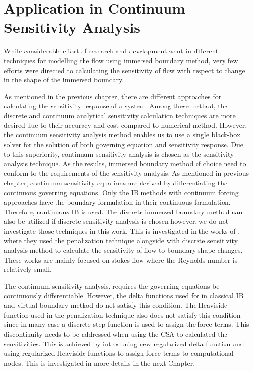 \section{Application in Continuum Sensitivity Analysis}
While considerable effort of research and development went in different techniques for modelling the flow using immersed boundary method, very few efforts were directed to calculating the sensitivity of flow with respect to change in the shape of the immersed boundary.

As mentioned in the previous chapter, there are different approaches for calculating the sensitivity response of a system. Among these method, the discrete and continuum analytical sensitivity calculation techniques are more desired due to their accuracy and cost compared to numerical method. However, the continuum sensitivity analysis method enables us to use a single black-box solver for the solution of both governing equation and sensitivity response. Due to this superiority, continuum sensitivity analysis is chosen as the sensitivity analysis technique. As the results, immersed boundary method of choice need to conform to the requirements of the sensitivity analysis. As mentioned in previous chapter, continuum sensitivity equations are derived by differentiating the continuous governing equations. Only the IB methods with continuum forcing approaches have the boundary formulation in their continuous formulation. Therefore, continuous IB is used. The discrete immersed boundary method can also be utilized if discrete sensitivity analysis is chosen however, we do not investigate those techniques in this work. This is investigated in the works of \cite{kreissl2011explicit, borrvall2003topology, challis2009level}, where they used the penalization technique alongside with discrete sensitivity analysis method to calculate the sensitivity of flow to boundary shape changes. These works are mainly focused on stokes flow where the Reynolds number is relatively small.

The continuum sensitivity analysis, requires the governing equations be continuously differentiable. However, the delta functions used for in classical IB and virtual boundary method do not satisfy this condition. The Heaviside function used in the penalization technique also does not satisfy this condition since in many case a discrete step function is used to assign the force terms. This discontinuity needs to be addressed when using the CSA to calculated the sensitivities. This is achieved by introducing new regularized delta function and using regularized Heaviside functions to assign force terms to computational nodes. This is investigated in more details in the next Chapter.

